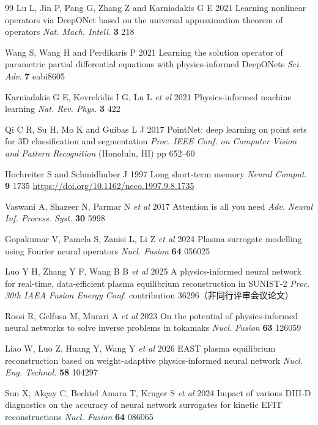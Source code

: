 \documentclass[a4paper,12pt]{ctexart}
\begin{document}
\begin{thebibliography}{99}
Lu L, Jin P, Pang G, Zhang Z and Karniadakis G E 2021 Learning nonlinear operators via DeepONet based on the universal approximation theorem of operators \textit{Nat. Mach. Intell.} \textbf{3} 218

Wang S, Wang H and Perdikaris P 2021 Learning the solution operator of parametric partial differential equations with physics-informed DeepONets \textit{Sci. Adv.} \textbf{7} eabi8605

Karniadakis G E, Kevrekidis I G, Lu L \textit{et al} 2021 Physics-informed machine learning \textit{Nat. Rev. Phys.} \textbf{3} 422

Qi C R, Su H, Mo K and Guibas L J 2017 PointNet: deep learning on point sets for 3D classification and segmentation \textit{Proc. IEEE Conf. on Computer Vision and Pattern Recognition} (Honolulu, HI) pp 652--60

Hochreiter S and Schmidhuber J 1997 Long short-term memory \textit{Neural Comput.} \textbf{9} 1735 \url{https://doi.org/10.1162/neco.1997.9.8.1735}

Vaswani A, Shazeer N, Parmar N \textit{et al} 2017 Attention is all you need \textit{Adv. Neural Inf. Process. Syst.} \textbf{30} 5998

Gopakumar V, Pamela S, Zanisi L, Li Z \textit{et al} 2024 Plasma surrogate modelling using Fourier neural operators \textit{Nucl. Fusion} \textbf{64} 056025

Luo Y H, Zhang Y F, Wang B B \textit{et al} 2025 A physics-informed neural network for real-time, data-efficient plasma equilibrium reconstruction in SUNIST-2 \textit{Proc. 30th IAEA Fusion Energy Conf.} contribution 36296（非同行评审会议论文）

Rossi R, Gelfusa M, Murari A \textit{et al} 2023 On the potential of physics-informed neural networks to solve inverse problems in tokamaks \textit{Nucl. Fusion} \textbf{63} 126059

Liao W, Luo Z, Huang Y, Wang Y \textit{et al} 2026 EAST plasma equilibrium reconstruction based on weight-adaptive physics-informed neural network \textit{Nucl. Eng. Technol.} \textbf{58} 104297

Sun X, Ak\c{c}ay C, Bechtel Amara T, Kruger S \textit{et al} 2024 Impact of various DIII-D diagnostics on the accuracy of neural network surrogates for kinetic EFIT reconstructions \textit{Nucl. Fusion} \textbf{64} 086065

\end{thebibliography}
\end{document}
